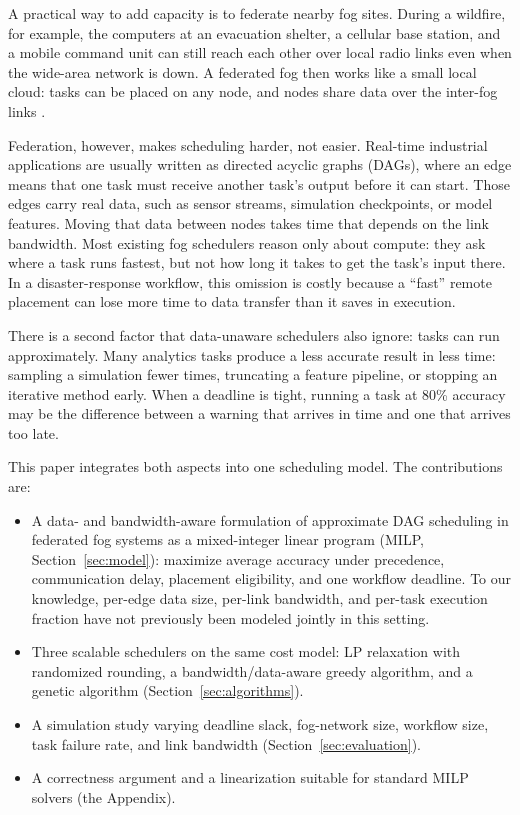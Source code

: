 \documentclass[conference]{IEEEtran}
\begin{document}
A practical way to add capacity is to federate nearby fog sites. During a wildfire, for example, the computers at an evacuation shelter, a cellular base station, and a mobile command unit can still reach each other over local radio links even when the wide-area network is down. A federated fog then works like a small local cloud: tasks can be placed on any node, and nodes share data over the inter-fog links \cite{fgcs2024,hong2019survey}.

Federation, however, makes scheduling harder, not easier. Real-time industrial applications are usually written as directed acyclic graphs (DAGs), where an edge means that one task must receive another task's output before it can start. Those edges carry real data, such as sensor streams, simulation checkpoints, or model features. Moving that data between nodes takes time that depends on the link bandwidth. Most existing fog schedulers reason only about compute: they ask where a task runs fastest, but not how long it takes to get the task's input there. In a disaster-response workflow, this omission is costly because a ``fast'' remote placement can lose more time to data transfer than it saves in execution.

There is a second factor that data-unaware schedulers also ignore: tasks can run approximately. Many analytics tasks produce a less accurate result in less time: sampling a simulation fewer times, truncating a feature pipeline, or stopping an iterative method early. When a deadline is tight, running a task at 80\% accuracy may be the difference between a warning that arrives in time and one that arrives too late.

This paper integrates both aspects into one scheduling model. The contributions are:

\begin{itemize}
    \item A data- and bandwidth-aware formulation of approximate DAG scheduling in federated fog systems as a mixed-integer linear program (MILP, Section~\ref{sec:model}): maximize average accuracy under precedence, communication delay, placement eligibility, and one workflow deadline. To our knowledge, per-edge data size, per-link bandwidth, and per-task execution fraction have not previously been modeled jointly in this setting.
    \item Three scalable schedulers on the same cost model: LP relaxation with randomized rounding, a bandwidth/data-aware greedy algorithm, and a genetic algorithm (Section~\ref{sec:algorithms}).
    \item A simulation study varying deadline slack, fog-network size, workflow size, task failure rate, and link bandwidth (Section~\ref{sec:evaluation}).
    \item A correctness argument and a linearization suitable for standard MILP solvers (the Appendix).
\end{itemize}
\end{document}
